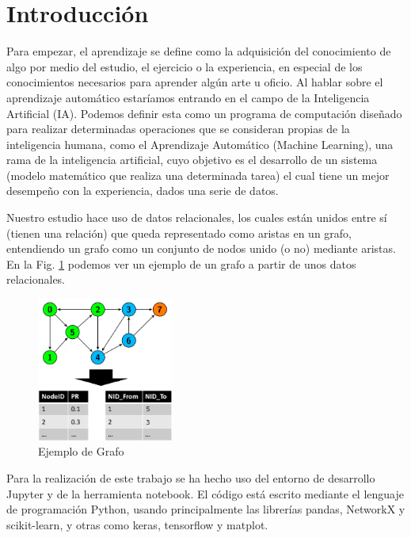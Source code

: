 \documentclass[conference,a4paper]{IEEEtran}
\begin{document}
\section{Introducción}


Para empezar, el aprendizaje se define como la adquisición del conocimiento de algo por medio del estudio, el ejercicio o la experiencia, en especial de los conocimientos necesarios para aprender algún arte u oficio. Al hablar sobre el aprendizaje automático estaríamos entrando en el campo de la Inteligencia Artificial (IA). Podemos definir esta como un programa de computación diseñado para realizar determinadas operaciones que se consideran propias de la inteligencia humana, como el Aprendizaje Automático (Machine Learning), una rama de la inteligencia artificial, cuyo objetivo es el desarrollo de un sistema (modelo matemático que realiza una determinada tarea)  el cual tiene un mejor desempeño con la experiencia, dados una serie de datos.

Nuestro estudio hace uso de datos relacionales, los cuales están unidos entre sí (tienen una relación) que queda representado como aristas en un grafo, entendiendo un grafo como un conjunto de nodos unido (o no) mediante aristas. En la Fig. \ref{fig:tablaEj} podemos ver un ejemplo de un grafo a partir de unos datos relacionales. 

\begin{figure} %
    \centering
    \includegraphics[width=0.4\textwidth]{./ImagenesMemoria/TablaEjemplo}
    \caption{\label{fig:tablaEj}Ejemplo de Grafo}
\end{figure}


Para la realización de este trabajo se ha hecho uso del entorno de desarrollo Jupyter y de la herramienta notebook. El código está escrito mediante el lenguaje de programación Python, usando principalmente las librerías pandas, NetworkX y scikit-learn, y otras como keras, tensorflow y matplot.
\end{document}
